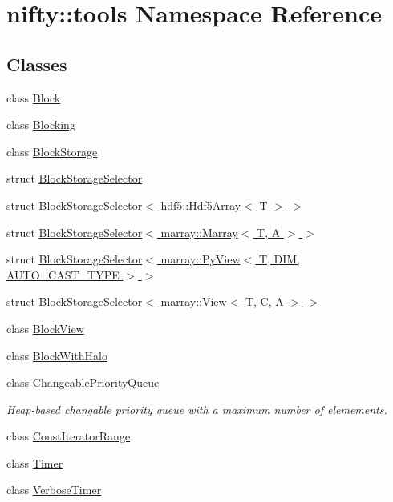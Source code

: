 \hypertarget{namespacenifty_1_1tools}{}\section{nifty\+:\+:tools Namespace Reference}
\label{namespacenifty_1_1tools}
\subsection*{Classes}
\begin{DoxyCompactItemize}
\item 
class \hyperlink{classnifty_1_1tools_1_1Block}{Block}
\item 
class \hyperlink{classnifty_1_1tools_1_1Blocking}{Blocking}
\item 
class \hyperlink{classnifty_1_1tools_1_1BlockStorage}{Block\+Storage}
\item 
struct \hyperlink{structnifty_1_1tools_1_1BlockStorageSelector}{Block\+Storage\+Selector}
\item 
struct \hyperlink{structnifty_1_1tools_1_1BlockStorageSelector_3_01hdf5_1_1Hdf5Array_3_01T_01_4_01_4}{Block\+Storage\+Selector$<$ hdf5\+::\+Hdf5\+Array$<$ T $>$ $>$}
\item 
struct \hyperlink{structnifty_1_1tools_1_1BlockStorageSelector_3_01marray_1_1Marray_3_01T_00_01A_01_4_01_4}{Block\+Storage\+Selector$<$ marray\+::\+Marray$<$ T, A $>$ $>$}
\item 
struct \hyperlink{structnifty_1_1tools_1_1BlockStorageSelector_3_01marray_1_1PyView_3_01T_00_01DIM_00_01AUTO__CAST__TYPE_01_4_01_4}{Block\+Storage\+Selector$<$ marray\+::\+Py\+View$<$ T, D\+I\+M, A\+U\+T\+O\+\_\+\+C\+A\+S\+T\+\_\+\+T\+Y\+P\+E $>$ $>$}
\item 
struct \hyperlink{structnifty_1_1tools_1_1BlockStorageSelector_3_01marray_1_1View_3_01T_00_01C_00_01A_01_4_01_4}{Block\+Storage\+Selector$<$ marray\+::\+View$<$ T, C, A $>$ $>$}
\item 
class \hyperlink{classnifty_1_1tools_1_1BlockView}{Block\+View}
\item 
class \hyperlink{classnifty_1_1tools_1_1BlockWithHalo}{Block\+With\+Halo}
\item 
class \hyperlink{classnifty_1_1tools_1_1ChangeablePriorityQueue}{Changeable\+Priority\+Queue}
\begin{DoxyCompactList}\small\item\em Heap-\/based changable priority queue with a maximum number of elemements. \end{DoxyCompactList}\item 
class \hyperlink{classnifty_1_1tools_1_1ConstIteratorRange}{Const\+Iterator\+Range}
\item 
class \hyperlink{classnifty_1_1tools_1_1Timer}{Timer}
\item 
class \hyperlink{classnifty_1_1tools_1_1VerboseTimer}{Verbose\+Timer}
\end{DoxyCompactItemize}
